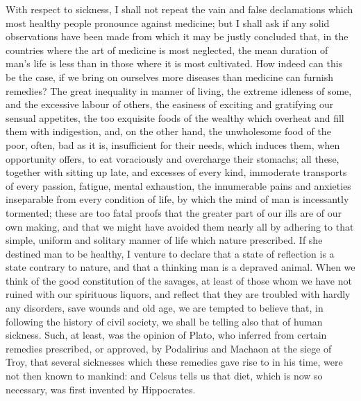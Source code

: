 \documentclass[12pt]{report}
\begin{document}
With respect to sickness, I shall not repeat the vain and false declamations which most healthy people pronounce against medicine; but I shall ask if any solid observations have been made from which it may be justly concluded that, in the countries where the art of medicine is most neglected, the mean duration of man's life is less than in those where it is most cultivated. How indeed can this be the case, if we bring on ourselves more diseases than medicine can furnish remedies? The great inequality in manner of living, the extreme idleness of some, and the excessive labour of others, the easiness of exciting and gratifying our sensual appetites, the too exquisite foods of the wealthy which overheat and fill them with indigestion, and, on the other hand, the unwholesome food of the poor, often, bad as it is, insufficient for their needs, which induces them, when opportunity offers, to eat voraciously and overcharge their stomachs; all these, together with sitting up late, and excesses of every kind, immoderate transports of every passion, fatigue, mental exhaustion, the innumerable pains and anxieties inseparable from every condition of life, by which the mind of man is incessantly tormented; these are too fatal proofs that the greater part of our ills are of our own making, and that we might have avoided them nearly all by adhering to that simple, uniform and solitary manner of life which nature prescribed. If she destined man to be healthy, I venture to declare that a state of reflection is a state contrary to nature, and that a thinking man is a depraved animal. When we think of the good constitution of the savages, at least of those whom we have not ruined with our spirituous liquors, and reflect that they are troubled with hardly any disorders, save wounds and old age, we are tempted to believe that, in following the history of civil society, we shall be telling also that of human sickness. Such, at least, was the opinion of Plato, who inferred from certain remedies prescribed, or approved, by Podalirius and Machaon at the siege of Troy, that several sicknesses which these remedies gave rise to in his time, were not then known to mankind: and Celsus tells us that diet, which is now so necessary, was first invented by Hippocrates.
\end{document}
